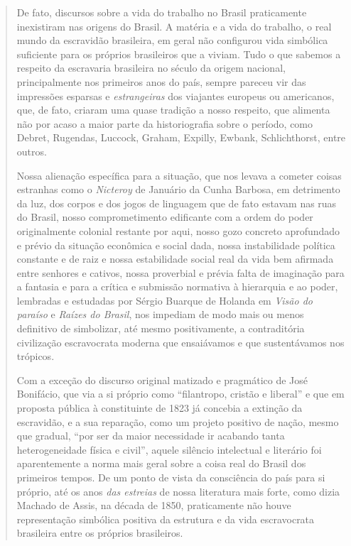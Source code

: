 \begin{quote}
De fato, discursos sobre a vida do trabalho no Brasil praticamente
inexistiram nas origens do Brasil. A matéria e a vida do trabalho, o
real mundo da escravidão brasileira, em geral não configurou vida
simbólica suficiente para os próprios brasileiros que a viviam. Tudo o
que sabemos a respeito da escravaria brasileira no século da origem
nacional, principalmente nos primeiros anos do país, sempre pareceu vir
das impressões esparsas e \emph{estrangeiras} dos viajantes europeus ou
americanos, que, de fato, criaram uma quase tradição a nosso respeito,
que alimenta não por acaso a maior parte da historiografia sobre o
período, como Debret, Rugendas, Luccock, Graham, Expilly, Ewbank,
Schlichthorst, entre outros.

Nossa alienação específica para a situação, que nos levava a cometer
coisas estranhas como o \emph{Nicteroy} de Januário da Cunha Barbosa, em
detrimento da luz, dos corpos e dos jogos de linguagem que de fato
estavam nas ruas do Brasil, nosso comprometimento edificante com a ordem
do poder originalmente colonial restante por aqui, nosso gozo concreto
aprofundado e prévio da situação econômica e social dada, nossa
instabilidade política constante e de raiz e nossa estabilidade social
real da vida bem afirmada entre senhores e cativos, nossa proverbial e
prévia falta de imaginação para a fantasia e para a crítica e submissão
normativa à hierarquia e ao poder, lembradas e estudadas por Sérgio
Buarque de Holanda em \emph{Visão do paraíso} e \emph{Raízes do Brasil},
nos impediam de modo mais ou menos definitivo de simbolizar, até mesmo
positivamente, a contraditória civilização escravocrata moderna que
ensaiávamos e que sustentávamos nos trópicos.

Com a exceção do discurso original matizado e pragmático de José
Bonifácio, que via a si próprio como ``filantropo, cristão e liberal'' e
que em proposta pública à constituinte de 1823 já concebia a extinção da
escravidão, e a sua reparação, como um projeto positivo de nação, mesmo
que gradual, ``por ser da maior necessidade ir acabando tanta
heterogeneidade física e civil'', aquele silêncio intelectual e
literário foi aparentemente a norma mais geral sobre a coisa real do
Brasil dos primeiros tempos. De um ponto de vista da consciência do país
para si próprio, até os anos \emph{das estreias} de nossa literatura
mais forte, como dizia Machado de Assis, na década de 1850, praticamente
não houve representação simbólica positiva da estrutura e da vida
escravocrata brasileira entre os próprios brasileiros.


\end{quote}

